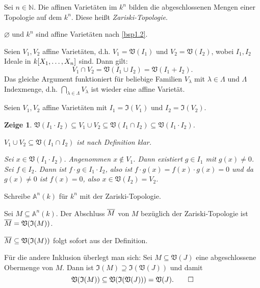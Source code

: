 \documentclass[a4paper,12pt]{scrbook}
\makeatletter
\theoremstyle{blah}
\newtheorem*{zeige}{Zeige}
\theoremstyle{stz}
\renewcommand{\proofname}{Beweis}
\renewenvironment{proof}[1][\proofname]{\par
  \pushQED{\qed}%
  \normalfont \topsep6\p@\@plus6\p@\relax
  \trivlist
  \item[\hskip\labelsep
        \itshape
    #1\@addpunct{:}]\ignorespaces
}{%
  \popQED\endtrivlist\@endpefalse
}
\def\A{\mathbb{A}}
\def\V{\mathfrak{V}}
\def\I{\mathfrak{I}}
\newcommand{\leer}{\ensuremath{\varnothing}}
\newcommand{\set}[1]{\ensuremath{\mathbb{#1}}}
\newcommand{\N}{\set{N}}
\def\Bar#1{\ensuremath\overline{#1}}
\newcommand{\polyx}[1][n]{\ensuremath%
  [X_{1},\dotsc,X_{#1}]}
\makeatother
\begin{document}
\begin{db}\label{1.2.1}Sei $n\in\N$. Die affinen Varietäten im $k^{n}$ bilden die abgeschlossenen Mengen einer Topologie auf dem $k^{n}$. Diese heißt \emph{Zariski-Topologie}.\end{db}
\begin{proof}\begin{prooflist}
\item $\leer$ und $k^{n}$ sind affine Varietäten nach \autoref{bsp1.2}.
\item Seien $V_{1},V_{2}$ affine Varietäten, d.h. $V_{1}=\V(I_{1})$ und $V_{2}=\V(I_{2})$, wobei $I_{1},I_{2}$ Ideale in $k\polyx$ sind. Dann gilt:
\[V_{1}\cap V_{2}=\V(I_{1}\cup I_{2}) = \V(I_{1}+I_{2}).\]
Das gleiche Argument funktioniert für beliebige Familien $V_{\lambda}$ mit $\lambda\in\Lambda$ und $\Lambda$ Indexmenge, d.h. $\displaystyle\bigcap_{\lambda\in\Lambda}V_{\lambda}$ ist wieder eine affine Varietät.
\item Seien $V_{1},V_{2}$ affine Varietäten mit $I_{1}=\I(V_{1})$ und $I_{2}=\I(V_{2})$.
\begin{zeige} $\V(I_{1}\cdot I_{2})\subseteq V_{1}\cup V_{2}\subseteq \V(I_{1}\cap I_{2})\subseteq \V(I_{1}\cdot I_{2})$.
\begin{prooflist}
\item $V_{1}\cup V_{2}\subseteq \V(I_{1}\cap I_{2})$ ist nach Definition klar.
\item Sei $x\in \V(I_{1}\cdot I_{2})$. Angenommen $x\notin V_{1}$. Dann existiert $g\in I_{1}$ mit $g(x)\neq 0$. Sei $f\in I_{2}$. Dann ist $f\cdot g\in I_{1}\cdot I_{2}$, also ist $f\cdot g(x) = f(x)\cdot g(x) = 0$ und da $g(x)\neq 0$ ist $f(x)=0$, also $x\in \V(I_{2})=V_{2}$.
\end{prooflist}\end{zeige}
\end{prooflist}\end{proof}

\begin{dfn}\label{1.2.2}
Schreibe $\A^{n}(k)$ für $k^{n}$ mit der Zariski-Topologie.
\end{dfn}

\begin{bem}\label{1.2.3}
Sei $M\subseteq\A^{n}(k)$. Der Abschluss $\Bar{M}$ von $M$ bezüglich der Zariski-Topologie ist $\Bar{M}=\V(\I(M))$.
\end{bem}
\begin{proof}
$\Bar{M}\subseteq \V(\I(M))$ folgt sofort aus der Definition.

Für die andere Inklusion überlegt man sich: Sei $M\subseteq\V(J)$ eine abgeschlossene Obermenge von $M$. Dann ist $\I(M)\supseteq\I(\V(J))$ und damit
\[\V(\I(M))\subseteq\V(\I(\V(J)))=\V(J).\qedhere\]
\end{proof}
\end{document}
